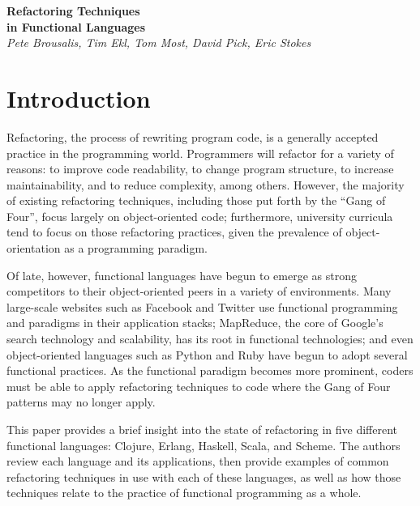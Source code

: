 \documentclass{article}
\begin{document}

\vspace*{60mm}
\begin{center}
{ \huge \textbf{Refactoring Techniques \\ in Functional Languages} } \\
{ \large \textit{Pete Brousalis, Tim Ekl, Tom Most, David Pick, Eric Stokes} }
\end{center}

\newpage{}

\tableofcontents

\newpage{}

\section{Introduction}

Refactoring, the process of rewriting program code, is a generally accepted practice in the programming world. Programmers will refactor for a variety of reasons: to improve code readability, to change program structure, to increase maintainability, and to reduce complexity, among others. However, the majority of existing refactoring techniques, including those put forth by the ``Gang of Four'', focus largely on object-oriented code; furthermore, university curricula tend to focus on those refactoring practices, given the prevalence of object-orientation as a programming paradigm.

Of late, however, functional languages have begun to emerge as strong competitors to their object-oriented peers in a variety of environments. Many large-scale websites such as Facebook and Twitter use functional programming and paradigms in their application stacks; MapReduce, the core of Google's search technology and scalability, has its root in functional technologies; and even object-oriented languages such as Python and Ruby have begun to adopt several functional practices. As the functional paradigm becomes more prominent, coders must be able to apply refactoring techniques to code where the Gang of Four patterns may no longer apply.

This paper provides a brief insight into the state of refactoring in five different functional languages: Clojure, Erlang, Haskell, Scala, and Scheme. The authors review each language and its applications, then provide examples of common refactoring techniques in use with each of these languages, as well as how those techniques relate to the practice of functional programming as a whole.
\end{document}

